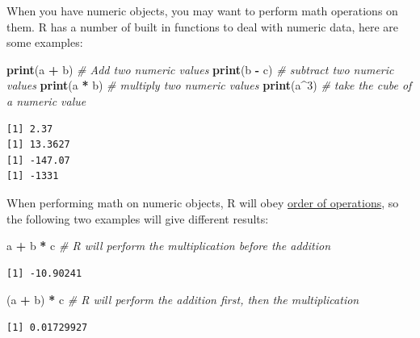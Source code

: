 \documentclass[
]{book}
\newenvironment{Shaded}{\begin{snugshade}}{\end{snugshade}}
\newcommand{\CommentTok}[1]{\textcolor[rgb]{0.56,0.35,0.01}{\textit{#1}}}
\newcommand{\DecValTok}[1]{\textcolor[rgb]{0.00,0.00,0.81}{#1}}
\newcommand{\KeywordTok}[1]{\textcolor[rgb]{0.13,0.29,0.53}{\textbf{#1}}}
\newcommand{\NormalTok}[1]{#1}
\newcommand{\OperatorTok}[1]{\textcolor[rgb]{0.81,0.36,0.00}{\textbf{#1}}}
\newcommand{\StringTok}[1]{\textcolor[rgb]{0.31,0.60,0.02}{#1}}
\begin{document}
When you have numeric objects, you may want to perform math operations on them.
R has a number of built in functions to deal with numeric data, here are some examples:

\begin{Shaded}
\begin{Highlighting}[]
\KeywordTok{print}\NormalTok{(a }\OperatorTok{+}\StringTok{ }\NormalTok{b)  }\CommentTok{# Add two numeric values}
\KeywordTok{print}\NormalTok{(b }\OperatorTok{-}\StringTok{ }\NormalTok{c)  }\CommentTok{# subtract two numeric values }
\KeywordTok{print}\NormalTok{(a }\OperatorTok{*}\StringTok{ }\NormalTok{b)  }\CommentTok{# multiply two numeric values}
\KeywordTok{print}\NormalTok{(a}\OperatorTok{^}\DecValTok{3}\NormalTok{)    }\CommentTok{# take the cube of a numeric value}
\end{Highlighting}
\end{Shaded}

\begin{verbatim}
[1] 2.37
[1] 13.3627
[1] -147.07
[1] -1331
\end{verbatim}

When performing math on numeric objects, R will obey \href{https://en.wikipedia.org/wiki/Order_of_operations}{order of operations}, so the following two examples will give different results:

\begin{Shaded}
\begin{Highlighting}[]
\NormalTok{a }\OperatorTok{+}\StringTok{ }\NormalTok{b }\OperatorTok{*}\StringTok{ }\NormalTok{c    }\CommentTok{# R will perform the multiplication before the addition}
\end{Highlighting}
\end{Shaded}

\begin{verbatim}
[1] -10.90241
\end{verbatim}

\begin{Shaded}
\begin{Highlighting}[]
\NormalTok{(a }\OperatorTok{+}\StringTok{ }\NormalTok{b) }\OperatorTok{*}\StringTok{ }\NormalTok{c  }\CommentTok{# R will perform the addition first, then the multiplication }
\end{Highlighting}
\end{Shaded}

\begin{verbatim}
[1] 0.01729927
\end{verbatim}
\end{document}
